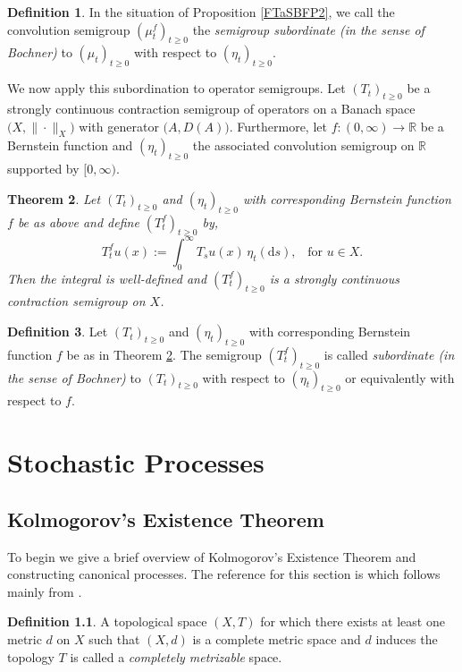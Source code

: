 \documentclass[a4paper, 12pt]{report}
\newtheorem{theorem}{Theorem}[section]
\theoremstyle{cor}
\theoremstyle{remark}
\theoremstyle{definition}
\newtheorem{defn}[theorem]{Definition}
\begin{document}
\begin{defn}
In the situation of Proposition \ref{FTaSBFP2}, we call the convolution semigroup $(\mu_t^f)_{t \ge 0}$ the \emph{semigroup subordinate (in the sense of Bochner)} to $(\mu_t)_{t \ge 0}$ with respect to $(\eta_t)_{t \ge 0}$.
\end{defn}

We now apply this subordination to operator semigroups.  Let $(T_t)_{t \ge 0}$ be a strongly continuous contraction semigroup of operators on a Banach space $\big(X, \|\cdot\|_X)$ with generator $\big(A, D(A)\big)$.  Furthermore, let $f : (0, \infty) \to \mathbb{R}$ be a Bernstein function and $(\eta_t)_{t \ge 0}$ the associated convolution semigroup on $\mathbb{R}$ supported by $[0, \infty)$.
\begin{theorem}\label{FTaSBFT2}
Let $(T_t)_{t \ge 0}$ and $(\eta_t)_{t \ge 0}$ with corresponding Bernstein function $f$ be as above and define $(T_t^f)_{t \ge 0}$ by,
\begin{equation}
T_t^fu(x) := \int_0^\infty T_su(x)\,\eta_t(\mathrm{d}s), \,\,\,\,\, \text{for } u \in X.
\end{equation}
Then the integral is well-defined and $(T_t^f)_{t \ge 0}$ is a strongly continuous contraction semigroup on $X$.
\end{theorem}

\begin{defn}
Let $(T_t)_{t \ge 0}$ and $(\eta_t)_{t \ge 0}$ with corresponding Bernstein function $f$ be as in Theorem \ref{FTaSBFT2}.  The semigroup $(T_t^f)_{t \ge 0}$ is called \emph{subordinate (in the sense of Bochner)} to $(T_t)_{t \ge 0}$ with respect to $(\eta_t)_{t \ge 0}$ or equivalently with respect to $f$.
\end{defn}


\chapter{Stochastic Processes}\label{Ch.oSP}

\section{Kolmogorov's Existence Theorem}\label{Se.KEThm}

To begin we give a brief overview of Kolmogorov's Existence Theorem and constructing canonical processes.  The reference for this section is \cite{Vol3} which follows mainly from \cite{SPRef}.

\begin{defn}
A topological space $(X, T)$ for which there exists at least one metric $d$ on $X$ such that $(X, d)$ is a complete metric space and $d$ induces the topology $T$ is called a \emph{completely metrizable} space.
\end{defn}
\end{document}
